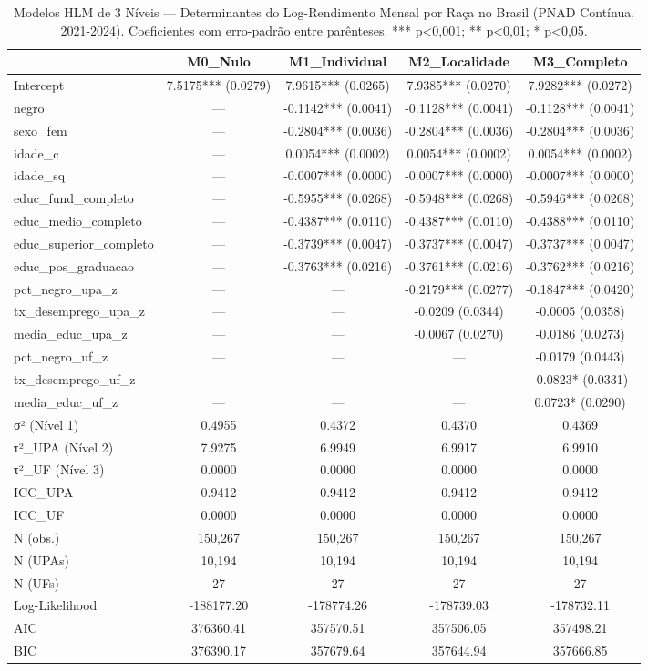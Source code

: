 \begin{table}
\caption{Modelos HLM de 3 Níveis — Determinantes do Log-Rendimento Mensal por Raça no Brasil (PNAD Contínua, 2021-2024). Coeficientes com erro-padrão entre parênteses. *** p<0,001; ** p<0,01; * p<0,05.}
\label{tab:hlm_coeficientes}
\begin{tabular}{lcccc}
\toprule
 & M0_Nulo & M1_Individual & M2_Localidade & M3_Completo \\
\midrule
Intercept & 7.5175***
(0.0279) & 7.9615***
(0.0265) & 7.9385***
(0.0270) & 7.9282***
(0.0272) \\
negro & — & -0.1142***
(0.0041) & -0.1128***
(0.0041) & -0.1128***
(0.0041) \\
sexo_fem & — & -0.2804***
(0.0036) & -0.2804***
(0.0036) & -0.2804***
(0.0036) \\
idade_c & — & 0.0054***
(0.0002) & 0.0054***
(0.0002) & 0.0054***
(0.0002) \\
idade_sq & — & -0.0007***
(0.0000) & -0.0007***
(0.0000) & -0.0007***
(0.0000) \\
educ_fund_completo & — & -0.5955***
(0.0268) & -0.5948***
(0.0268) & -0.5946***
(0.0268) \\
educ_medio_completo & — & -0.4387***
(0.0110) & -0.4387***
(0.0110) & -0.4388***
(0.0110) \\
educ_superior_completo & — & -0.3739***
(0.0047) & -0.3737***
(0.0047) & -0.3737***
(0.0047) \\
educ_pos_graduacao & — & -0.3763***
(0.0216) & -0.3761***
(0.0216) & -0.3762***
(0.0216) \\
pct_negro_upa_z & — & — & -0.2179***
(0.0277) & -0.1847***
(0.0420) \\
tx_desemprego_upa_z & — & — & -0.0209
(0.0344) & -0.0005
(0.0358) \\
media_educ_upa_z & — & — & -0.0067
(0.0270) & -0.0186
(0.0273) \\
pct_negro_uf_z & — & — & — & -0.0179
(0.0443) \\
tx_desemprego_uf_z & — & — & — & -0.0823*
(0.0331) \\
media_educ_uf_z & — & — & — & 0.0723*
(0.0290) \\
σ² (Nível 1) & 0.4955 & 0.4372 & 0.4370 & 0.4369 \\
τ²_UPA (Nível 2) & 7.9275 & 6.9949 & 6.9917 & 6.9910 \\
τ²_UF (Nível 3) & 0.0000 & 0.0000 & 0.0000 & 0.0000 \\
ICC_UPA & 0.9412 & 0.9412 & 0.9412 & 0.9412 \\
ICC_UF & 0.0000 & 0.0000 & 0.0000 & 0.0000 \\
N (obs.) & 150,267 & 150,267 & 150,267 & 150,267 \\
N (UPAs) & 10,194 & 10,194 & 10,194 & 10,194 \\
N (UFs) & 27 & 27 & 27 & 27 \\
Log-Likelihood & -188177.20 & -178774.26 & -178739.03 & -178732.11 \\
AIC & 376360.41 & 357570.51 & 357506.05 & 357498.21 \\
BIC & 376390.17 & 357679.64 & 357644.94 & 357666.85 \\
\bottomrule
\end{tabular}
\end{table}
